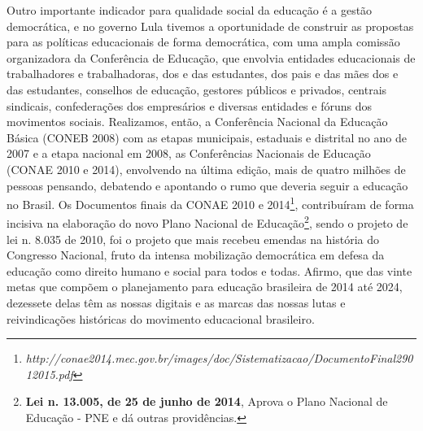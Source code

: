 Outro importante indicador para qualidade social da educação é a gestão
democrática, e no governo Lula tivemos a oportunidade de construir as
propostas para as políticas educacionais de forma democrática, com uma
ampla comissão organizadora da Conferência de Educação, que envolvia
entidades educacionais de trabalhadores e trabalhadoras, dos e das
estudantes, dos pais e das mães dos e das estudantes, conselhos de
educação, gestores públicos e privados, centrais sindicais,
confederações dos empresários e diversas entidades e fóruns dos
movimentos sociais. Realizamos, então, a Conferência Nacional da
Educação Básica (CONEB 2008) com as etapas municipais, estaduais e
distrital no ano de 2007 e a etapa nacional em 2008, as Conferências
Nacionais de Educação (CONAE 2010 e 2014), envolvendo na última edição,
mais de quatro milhões de pessoas pensando, debatendo e apontando o rumo
que deveria seguir a educação no Brasil. Os Documentos finais da CONAE
2010 e 2014\footnote{\emph{http://conae2014.mec.gov.br/images/doc/Sistematizacao/DocumentoFinal29012015.pdf}},
contribuíram de forma incisiva na elaboração do novo Plano Nacional de
Educação\footnote{\textbf{Lei n. 13.005, de 25 de junho de 2014}, Aprova
  o Plano Nacional de Educação - PNE e dá outras providências.}, sendo o
projeto de lei n. 8.035 de 2010, foi o projeto que mais recebeu emendas
na história do Congresso Nacional, fruto da intensa mobilização
democrática em defesa da educação como direito humano e social para
todos e todas. Afirmo, que das vinte metas que compõem o planejamento
para educação brasileira de 2014 até 2024, dezessete delas têm as nossas
digitais e as marcas das nossas lutas e reivindicações históricas do
movimento educacional brasileiro.

